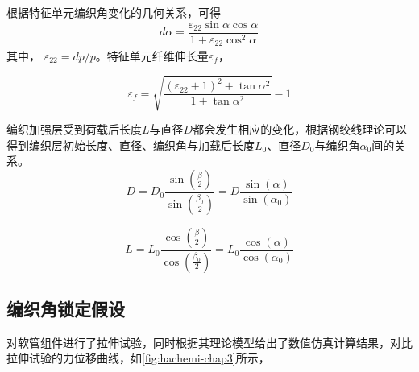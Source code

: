 根据特征单元编织角变化的几何关系，可得
\begin{equation}
d\alpha  = \frac{{{\varepsilon _{22}}\sin \alpha \cos \alpha }}{{1 + {\varepsilon _{22}}{{\cos }^2}\alpha }}_{}
\end{equation}
其中， $ \varepsilon_22= dp/p $。特征单元纤维伸长量$ \varepsilon_f $，


\begin{equation}
{\varepsilon _f} = \sqrt {\frac{{{{\left( {{\varepsilon _{22}} + 1} \right)}^2} + \tan {\alpha ^2}}}{{1 + \tan {\alpha ^2}}}}  - 1
\end{equation}

编织加强层受到荷载后长度$ L $与直径$ D $都会发生相应的变化，根据钢绞线理论可以得到编织层初始长度、直径、编织角与加载后长度$ {L_0} $、直径$ {D_0} $与编织角$ {\alpha _0} $间的关系。
\begin{equation}
D = {D_0}\frac{{\sin \left( {\frac{\beta }{2}} \right)}}{{\sin \left( {\frac{{{\beta _0}}}{2}} \right)}} = D\frac{{\sin \left( \alpha  \right)}}{{\sin \left( {{\alpha _0}} \right)}}
\end{equation}

\begin{equation}
L = {L_0}\frac{{\cos \left( {\frac{\beta }{2}} \right)}}{{\cos \left( {\frac{{{\beta _0}}}{2}} \right)}} = {L_0}\frac{{\cos \left( \alpha  \right)}}{{\cos \left( {{\alpha _0}} \right)}}
\end{equation}


\subsection{编织角锁定假设}

\hacite 对软管组件进行了拉伸试验，同时根据其理论模型给出了数值仿真计算结果，对比拉伸试验的力位移曲线，如\ref{fig:hachemi-chap3}所示，

